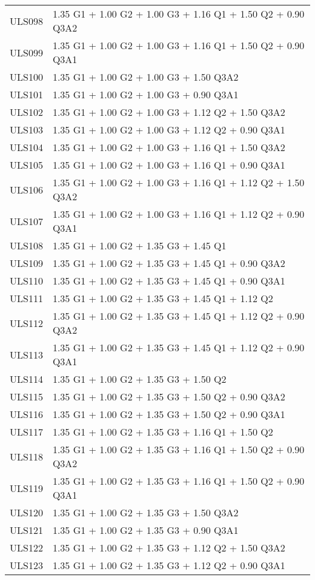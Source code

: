 \begin{center}
\begin{small}
\begin{longtable}{|l|p{10cm}|}
ULS098 & 1.35 G1 + 1.00 G2 + 1.00 G3 + 1.16 Q1 + 1.50 Q2 + 0.90 Q3A2\\
ULS099 & 1.35 G1 + 1.00 G2 + 1.00 G3 + 1.16 Q1 + 1.50 Q2 + 0.90 Q3A1\\
ULS100 & 1.35 G1 + 1.00 G2 + 1.00 G3 + 1.50 Q3A2\\
ULS101 & 1.35 G1 + 1.00 G2 + 1.00 G3 + 0.90 Q3A1\\
ULS102 & 1.35 G1 + 1.00 G2 + 1.00 G3 + 1.12 Q2 + 1.50 Q3A2\\
ULS103 & 1.35 G1 + 1.00 G2 + 1.00 G3 + 1.12 Q2 + 0.90 Q3A1\\
ULS104 & 1.35 G1 + 1.00 G2 + 1.00 G3 + 1.16 Q1 + 1.50 Q3A2\\
ULS105 & 1.35 G1 + 1.00 G2 + 1.00 G3 + 1.16 Q1 + 0.90 Q3A1\\
ULS106 & 1.35 G1 + 1.00 G2 + 1.00 G3 + 1.16 Q1 + 1.12 Q2 + 1.50 Q3A2\\
ULS107 & 1.35 G1 + 1.00 G2 + 1.00 G3 + 1.16 Q1 + 1.12 Q2 + 0.90 Q3A1\\
ULS108 & 1.35 G1 + 1.00 G2 + 1.35 G3 + 1.45 Q1\\
ULS109 & 1.35 G1 + 1.00 G2 + 1.35 G3 + 1.45 Q1 + 0.90 Q3A2\\
ULS110 & 1.35 G1 + 1.00 G2 + 1.35 G3 + 1.45 Q1 + 0.90 Q3A1\\
ULS111 & 1.35 G1 + 1.00 G2 + 1.35 G3 + 1.45 Q1 + 1.12 Q2\\
ULS112 & 1.35 G1 + 1.00 G2 + 1.35 G3 + 1.45 Q1 + 1.12 Q2 + 0.90 Q3A2\\
ULS113 & 1.35 G1 + 1.00 G2 + 1.35 G3 + 1.45 Q1 + 1.12 Q2 + 0.90 Q3A1\\
ULS114 & 1.35 G1 + 1.00 G2 + 1.35 G3 + 1.50 Q2\\
ULS115 & 1.35 G1 + 1.00 G2 + 1.35 G3 + 1.50 Q2 + 0.90 Q3A2\\
ULS116 & 1.35 G1 + 1.00 G2 + 1.35 G3 + 1.50 Q2 + 0.90 Q3A1\\
ULS117 & 1.35 G1 + 1.00 G2 + 1.35 G3 + 1.16 Q1 + 1.50 Q2\\
ULS118 & 1.35 G1 + 1.00 G2 + 1.35 G3 + 1.16 Q1 + 1.50 Q2 + 0.90 Q3A2\\
ULS119 & 1.35 G1 + 1.00 G2 + 1.35 G3 + 1.16 Q1 + 1.50 Q2 + 0.90 Q3A1\\
ULS120 & 1.35 G1 + 1.00 G2 + 1.35 G3 + 1.50 Q3A2\\
ULS121 & 1.35 G1 + 1.00 G2 + 1.35 G3 + 0.90 Q3A1\\
ULS122 & 1.35 G1 + 1.00 G2 + 1.35 G3 + 1.12 Q2 + 1.50 Q3A2\\
ULS123 & 1.35 G1 + 1.00 G2 + 1.35 G3 + 1.12 Q2 + 0.90 Q3A1\\

\end{longtable}
\end{small}
\end{center}
